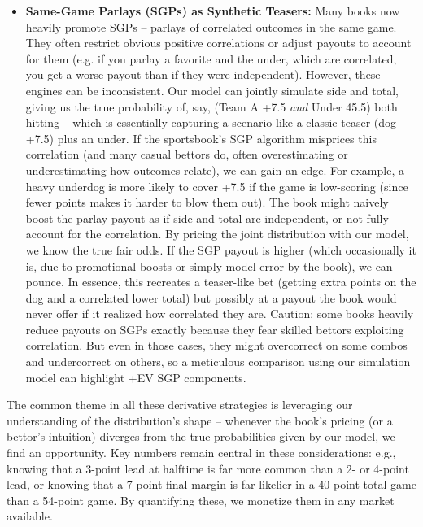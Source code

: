 \documentclass[11pt]{amsart}
\begin{document}
\begin{itemize}
    \item \textbf{Same-Game Parlays (SGPs) as Synthetic Teasers:} Many books now heavily promote SGPs – parlays of correlated outcomes in the same game. They often restrict obvious positive correlations or adjust payouts to account for them (e.g. if you parlay a favorite and the under, which are correlated, you get a worse payout than if they were independent). However, these engines can be inconsistent. Our model can jointly simulate side and total, giving us the true probability of, say, (Team A +7.5 \textit{and} Under 45.5) both hitting – which is essentially capturing a scenario like a classic teaser (dog +7.5) plus an under. If the sportsbook’s SGP algorithm misprices this correlation (and many casual bettors do, often overestimating or underestimating how outcomes relate), we can gain an edge. For example, a heavy underdog is more likely to cover +7.5 if the game is low-scoring (since fewer points makes it harder to blow them out). The book might naively boost the parlay payout as if side and total are independent, or not fully account for the correlation. By pricing the joint distribution with our model, we know the true fair odds. If the SGP payout is higher (which occasionally it is, due to promotional boosts or simply model error by the book), we can pounce. In essence, this recreates a teaser-like bet (getting extra points on the dog and a correlated lower total) but possibly at a payout the book would never offer if it realized how correlated they are. Caution: some books heavily reduce payouts on SGPs exactly because they fear skilled bettors exploiting correlation. But even in those cases, they might overcorrect on some combos and undercorrect on others, so a meticulous comparison using our simulation model can highlight +EV SGP components.
\end{itemize}
The common theme in all these derivative strategies is leveraging our understanding of the distribution’s shape – whenever the book’s pricing (or a bettor’s intuition) diverges from the true probabilities given by our model, we find an opportunity. Key numbers remain central in these considerations: e.g., knowing that a 3-point lead at halftime is far more common than a 2- or 4-point lead, or knowing that a 7-point final margin is far likelier in a 40-point total game than a 54-point game. By quantifying these, we monetize them in any market available.
\end{document}
